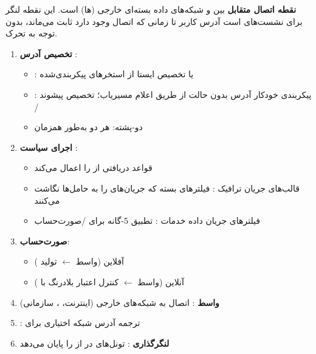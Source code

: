

\CNchained{}

 \textbf{نقطه اتصال متقابل} بین  و شبکه‌های داده بسته‌ای خارجی (ها) است. این نقطه لنگر  برای نشست‌های  است  آدرس  کاربر تا زمانی که اتصال  وجود دارد ثابت می‌ماند، بدون توجه به تحرک.


\begin{enumerate}
\def\labelenumi{\arabic{enumi}.}
\tightlist
\item
  \textbf{تخصیص آدرس }:

  \begin{itemize}
  \tightlist
  \item
    :  یا تخصیص ایستا از استخرهای پیکربندی‌شده
  \item
    : پیکربندی خودکار آدرس بدون حالت  از طریق اعلام مسیریاب؛ تخصیص پیشوند /\allowbreak{}
  \item
    دو-پشته: هر دو به‌طور همزمان
  \end{itemize}
\item
  \textbf{اجرای سیاست }:

  \begin{itemize}
  \tightlist
  \item
    قواعد  دریافتی از  را اعمال می‌کند
  \item
    قالب‌های جریان ترافیک : فیلترهای بسته که جریان‌های  را به حامل‌ها نگاشت می‌کنند
  \item
    فیلترهای جریان داده خدمات : تطبیق 5-گانه برای /\allowbreak{}صورت‌حساب
  \end{itemize}
\item
  \textbf{صورت‌حساب}:

  \begin{itemize}
  \tightlist
  \item
    آفلاین (واسط  \ensuremath{\leftarrow} تولید )
  \item
    آنلاین (واسط  \ensuremath{\leftarrow} کنترل اعتبار بلادرنگ با )
  \end{itemize}
\item
  \textbf{واسط }: اتصال به شبکه‌های خارجی (اینترنت، ،  سازمانی)
\item
  : ترجمه آدرس شبکه اختیاری برای 
\item
  \textbf{لنگرگذاری }: تونل‌های  در  از  را پایان می‌دهد
\end{enumerate}

